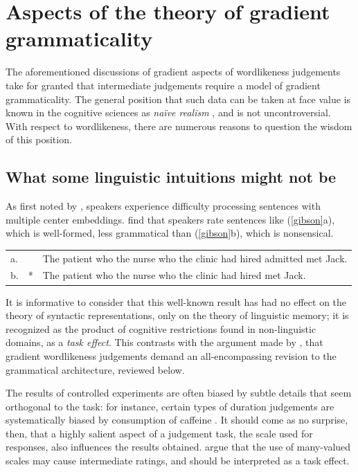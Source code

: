 \section{Aspects of the theory of gradient grammaticality}

The aforementioned discussions of gradient aspects of wordlikeness judgements take for granted that intermediate judgements require a model of gradient grammaticality. 
The general position that such data can be taken at face value is known in the cognitive sciences as \emph{naïve realism} \citep{Fodor1981a}, and is not uncontroversial. 
With respect to wordlikeness, there are numerous reasons to question the wisdom of this position.

\subsection{What some linguistic intuitions might not be}

As first noted by \citet{Chomsky1963b}, speakers experience difficulty processing sentences with multiple center embeddings. \citet{Gibson1999} find that speakers rate sentences like (\ref{gibson}a), which is well-formed, less grammatical than (\ref{gibson}b), which is nonsensical.

\begin{example}
\label{gibson}
\begin{tabular}{l l@{}l}
a. &    & The patient who the nurse who the clinic had hired admitted met Jack. \\
b. & *  & The patient who the nurse who the clinic had hired met Jack. \\
\end{tabular}
\end{example}

\noindent
It is informative to consider that this well-known result has had no effect on the theory of syntactic representations, only on the theory of linguistic memory; it is recognized as the product of cognitive restrictions found in non-linguistic domains, as a \emph{task effect}.
This contrasts with the argument made by \citet{Hayes2000}, that gradient wordlikeness judgements demand an all-encompassing revision to the grammatical architecture, reviewed below.

The results of controlled experiments are often biased by subtle details that seem orthogonal to the task: for instance, certain types of duration judgements are systematically biased by consumption of caffeine \citep{Gruber2005}. 
It should come as no surprise, then, that a highly salient aspect of a judgement task, the scale used for responses, also influences the results obtained.
\citet*{Armstrong1983} argue that the use of many-valued scales may cause intermediate ratings, and should be interpreted as a task effect.

